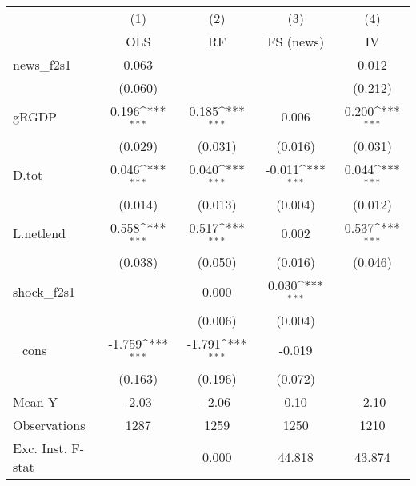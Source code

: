 {
\def\sym#1{\ifmmode^{#1}\else\(^{#1}\)\fi}
\begin{tabular}{l*{4}{c}}
\toprule
            &\multicolumn{1}{c}{(1)}&\multicolumn{1}{c}{(2)}&\multicolumn{1}{c}{(3)}&\multicolumn{1}{c}{(4)}\\
            &\multicolumn{1}{c}{OLS}&\multicolumn{1}{c}{RF}&\multicolumn{1}{c}{FS (news)}&\multicolumn{1}{c}{IV}\\
\midrule
news\_f2s1   &       0.063         &                     &                     &       0.012         \\
            &     (0.060)         &                     &                     &     (0.212)         \\
\addlinespace
gRGDP       &       0.196\sym{***}&       0.185\sym{***}&       0.006         &       0.200\sym{***}\\
            &     (0.029)         &     (0.031)         &     (0.016)         &     (0.031)         \\
\addlinespace
D.tot       &       0.046\sym{***}&       0.040\sym{***}&      -0.011\sym{***}&       0.044\sym{***}\\
            &     (0.014)         &     (0.013)         &     (0.004)         &     (0.012)         \\
\addlinespace
L.netlend   &       0.558\sym{***}&       0.517\sym{***}&       0.002         &       0.537\sym{***}\\
            &     (0.038)         &     (0.050)         &     (0.016)         &     (0.046)         \\
\addlinespace
shock\_f2s1  &                     &       0.000         &       0.030\sym{***}&                     \\
            &                     &     (0.006)         &     (0.004)         &                     \\
\addlinespace
\_cons      &      -1.759\sym{***}&      -1.791\sym{***}&      -0.019         &                     \\
            &     (0.163)         &     (0.196)         &     (0.072)         &                     \\
\midrule
Mean Y      &       -2.03         &       -2.06         &        0.10         &       -2.10         \\
Observations&        1287         &        1259         &        1250         &        1210         \\
Exc. Inst. F-stat&                     &       0.000         &      44.818         &      43.874         \\
\bottomrule
\end{tabular}
}
